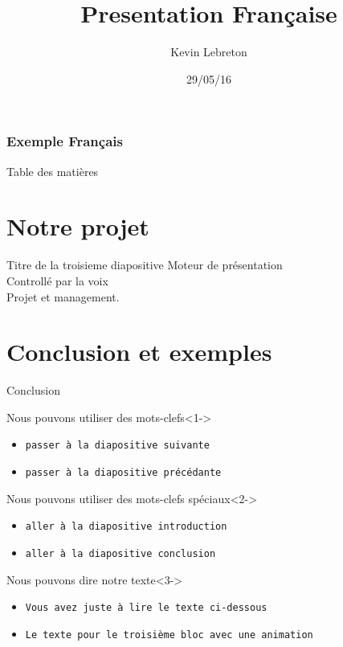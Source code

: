 \documentclass[english]{beamer}
\title{Presentation Française}
\author{Kevin Lebreton}
\date{29/05/16}
\begin{document}
  \begin{frame}
 \frametitle{Exemple Français}
	    \titlepage
  \end{frame}

  
  \begin{frame}{Table des matières}
	\tableofcontents
  \end{frame}

  \section{Notre projet}
  \begin{frame}{Titre de la troisieme diapositive}
    Moteur de présentation \\ 
    Controllé par la voix \\ 
    Projet et management.
  \end{frame}

  \section{Conclusion et exemples}
  \begin{frame}{Conclusion}
	\begin{block}{Nous pouvons utiliser des mots-clefs}<1->
	  	\begin{itemize}
	  		\item {\tt passer à la diapositive suivante}   		
    		\item {\tt passer à la diapositive précédante}
		\end{itemize}
	\end{block}

	\begin{block}{Nous pouvons utiliser des mots-clefs spéciaux}<2->
	  	\begin{itemize}
	  		\item {\tt aller à la diapositive introduction}   		
    		\item {\tt aller à la diapositive conclusion}
		\end{itemize}
	\end{block}

	\begin{block}{Nous pouvons dire notre texte}<3->
	  	\begin{itemize}
	  		\item {\tt Vous avez juste à lire le texte ci-dessous}   		
    		\item {\tt Le texte pour le troisième bloc avec une animation}
		\end{itemize}
	\end{block}
  \end{frame}
  
  {\1
\begin{frame}
\end{frame}
}
\end{document}
